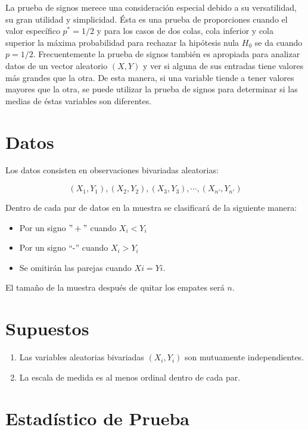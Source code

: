 \documentclass[
  a4paper,
  oneside,
  openany]{book}
\providecommand{\tightlist}{%
  \setlength{\itemsep}{0pt}\setlength{\parskip}{0pt}}
\begin{document}
La prueba de signos merece una consideración especial debido a su versatilidad, su gran utilidad y simplicidad. Ésta es una prueba de proporciones cuando el valor específico \(p^*=1/2\) y para los casos de dos colas, cola inferior y cola superior la máxima probabilidad para rechazar la hipótesis nula \(H_0\) se da cuando \(p = 1/2\). Frecuentemente la prueba de signos también es apropiada para analizar datos de un vector aleatorio \((X,Y)\) y ver si alguna de sus entradas tiene valores más grandes que la otra. De esta manera, si una variable tiende a tener valores mayores que la otra, se puede utilizar la prueba de signos para determinar si las medias de éstas variables son diferentes.

\hypertarget{datos-2}{%
\section{Datos}\label{datos-2}}

Los datos consisten en observaciones bivariadas aleatorias:

\[(X_{1},Y_{1}),(X_{2},Y_{2}),(X_{3},Y_{3}),\cdots,(X_{n'},Y_{n'})\]

Dentro de cada par de datos en la muestra se clasificará de la siguiente manera:

\begin{itemize}
\tightlist
\item
  Por un signo \("+"\) cuando \(X_{i} < Y_{i}\)
\item
  Por un signo ``-'' cuando \(X_{i} > Y_{i}\)
\item
  Se omitirán las parejas cuando \(Xi = Yi\).
\end{itemize}

El tamaño de la muestra después de quitar los empates será \(n\).

\hypertarget{supuestos-2}{%
\section{Supuestos}\label{supuestos-2}}

\begin{enumerate}
\def\labelenumi{\arabic{enumi})}
\item
  Las variables aleatorias bivariadas \((X_{i},Y_{i})\) son mutuamente independientes.
\item
  La escala de medida es al menos ordinal dentro de cada par.
\end{enumerate}

\hypertarget{estaduxedstico-de-prueba-2}{%
\section{Estadístico de Prueba}\label{estaduxedstico-de-prueba-2}}
\end{document}
